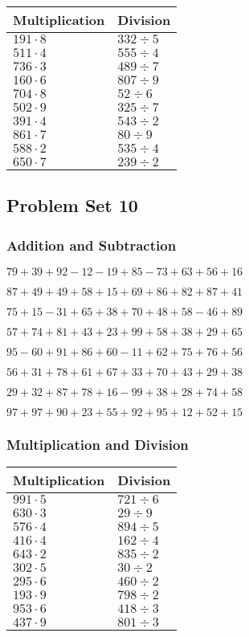 \begin{longtable}[]{@{}ll@{}}
\toprule
Multiplication & Division\tabularnewline
\midrule
\endhead
\(191\cdot8\) & \(332÷5\)\tabularnewline
\(511\cdot4\) & \(555÷4\)\tabularnewline
\(736\cdot3\) & \(489÷7\)\tabularnewline
\(160\cdot6\) & \(807÷9\)\tabularnewline
\(704\cdot8\) & \(52÷6\)\tabularnewline
\(502\cdot9\) & \(325÷7\)\tabularnewline
\(391\cdot4\) & \(543÷2\)\tabularnewline
\(861\cdot7\) & \(80÷9\)\tabularnewline
\(588\cdot2\) & \(535÷4\)\tabularnewline
\(650\cdot7\) & \(239÷2\)\tabularnewline
\bottomrule
\end{longtable}

\hypertarget{problem-set-10}{%
\subsection{Problem Set 10}\label{problem-set-10}}

\hypertarget{addition-and-subtraction-9}{%
\subsubsection{Addition and
Subtraction}\label{addition-and-subtraction-9}}

\(79+39+92-12-19+85-73+63+56+16\)

\(87+49+49+58+15+69+86+82+87+41\)

\(75+15-31+65+38+70+48+58-46+89\)

\(57+74+81+43+23+99+58+38+29+65\)

\(95-60+91+86+60-11+62+75+76+56\)

\(56+31+78+61+67+33+70+43+29+38\)

\(29+32+87+78+16-99+38+28+74+58\)

\(97+97+90+23+55+92+95+12+52+15\)

\hypertarget{multiplication-and-division-9}{%
\subsubsection{Multiplication and
Division}\label{multiplication-and-division-9}}

\begin{longtable}[]{@{}ll@{}}
\toprule
Multiplication & Division\tabularnewline
\midrule
\endhead
\(991\cdot5\) & \(721÷6\)\tabularnewline
\(630\cdot3\) & \(29÷9\)\tabularnewline
\(576\cdot4\) & \(894÷5\)\tabularnewline
\(416\cdot4\) & \(162÷4\)\tabularnewline
\(643\cdot2\) & \(835÷2\)\tabularnewline
\(302\cdot5\) & \(30÷2\)\tabularnewline
\(295\cdot6\) & \(460÷2\)\tabularnewline
\(193\cdot9\) & \(798÷2\)\tabularnewline
\(953\cdot6\) & \(418÷3\)\tabularnewline
\(437\cdot9\) & \(801÷3\)\tabularnewline
\bottomrule
\end{longtable}


